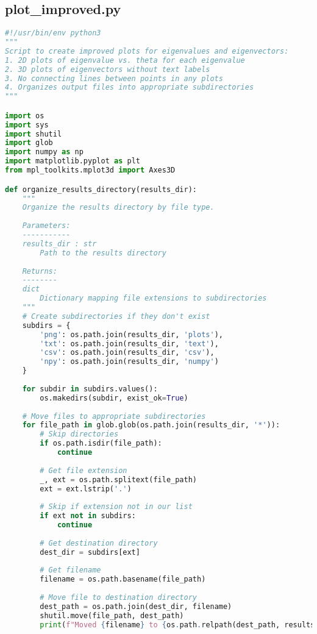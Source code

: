 \subsection{plot\_improved.py}

\begin{lstlisting}[language=Python]
#!/usr/bin/env python3
"""
Script to create improved plots for eigenvalues and eigenvectors:
1. 2D plots of eigenvalue vs. theta for each eigenvalue
2. 3D plots of eigenvectors without text labels
3. No connecting lines between points in any plots
4. Organizes output files into appropriate subdirectories
"""

import os
import sys
import shutil
import glob
import numpy as np
import matplotlib.pyplot as plt
from mpl_toolkits.mplot3d import Axes3D

def organize_results_directory(results_dir):
    """
    Organize the results directory by file type.
    
    Parameters:
    -----------
    results_dir : str
        Path to the results directory
    
    Returns:
    --------
    dict
        Dictionary mapping file extensions to subdirectories
    """
    # Create subdirectories if they don't exist
    subdirs = {
        'png': os.path.join(results_dir, 'plots'),
        'txt': os.path.join(results_dir, 'text'),
        'csv': os.path.join(results_dir, 'csv'),
        'npy': os.path.join(results_dir, 'numpy')
    }
    
    for subdir in subdirs.values():
        os.makedirs(subdir, exist_ok=True)
    
    # Move files to appropriate subdirectories
    for file_path in glob.glob(os.path.join(results_dir, '*')):
        # Skip directories
        if os.path.isdir(file_path):
            continue
        
        # Get file extension
        _, ext = os.path.splitext(file_path)
        ext = ext.lstrip('.')
        
        # Skip if extension not in our list
        if ext not in subdirs:
            continue
        
        # Get destination directory
        dest_dir = subdirs[ext]
        
        # Get filename
        filename = os.path.basename(file_path)
        
        # Move file to destination directory
        dest_path = os.path.join(dest_dir, filename)
        shutil.move(file_path, dest_path)
        print(f"Moved {filename} to {os.path.relpath(dest_path, results_dir)}")
    

\end{lstlisting}
